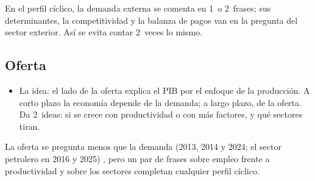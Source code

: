 \documentclass[11pt]{article}
\begin{document}
\begin{notaopositor}
En el perfil cíclico, la demanda externa se comenta en 1~o 2~frases; sus determinantes, la competitividad y la balanza de pagos van en la pregunta del sector exterior. Así se evita contar 2~veces lo mismo.
\end{notaopositor}

\subsection{Oferta}\label{sec:oferta}

\begin{itemize}
\item La idea: el lado de la oferta explica el PIB por el enfoque de la producción. A corto plazo la economía depende de la demanda; a largo plazo, de la oferta. Da 2~ideas: si se crece con productividad o con más factores, y qué sectores tiran.
\end{itemize}

\begin{notaopositor}
La oferta se pregunta menos que la demanda (2013, 2014 y 2024; el sector petrolero en 2016 y 2025) \parencite{ATCEE2026Examenes}, pero un par de frases sobre empleo frente a productividad y sobre los sectores completan cualquier perfil cíclico.
\end{notaopositor}
\end{document}
